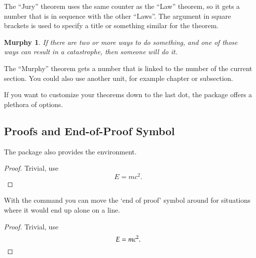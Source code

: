 The ``Jury'' theorem uses the same counter as the ``Law''
theorem, so it gets a number that is in sequence with
the other ``Laws''. The argument in square brackets is used to specify 
a title or something similar for the theorem.
\begin{example}
\newtheorem{mur}{Murphy}[section]

\begin{mur} If there are two or 
more ways to do something, and 
one of those ways can result in
a catastrophe, then someone 
will do it.\end{mur}
\end{example}

The ``Murphy'' theorem gets a number that is linked to the number of
the current section. You could also use another unit, for example chapter or
subsection.

If you want to customize your theorems down to the last dot, the
 package offers a plethora of options.


\subsection{Proofs and End-of-Proof Symbol}
\label{sec:putting-qed-right}

The  package also provides the  environment.

\begin{example}
\begin{proof}
 Trivial, use
 \begin{equation*}
   E=mc^2.
 \end{equation*}
\end{proof}
\end{example}

With the command  you can move the `end of proof' symbol
around for situations where it would end up alone on a line.

\begin{example}
\begin{proof}
 Trivial, use
 \begin{equation*}
   E=mc^2. \qedhere
 \end{equation*}
\end{proof}
\end{example}

